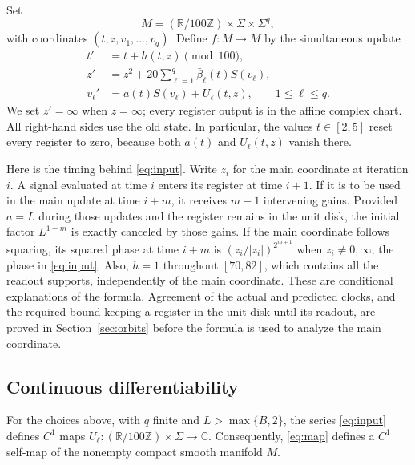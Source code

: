 Set
\[
 M=(\mathbb R/100\mathbb Z)\times\Sigma\times\Sigma^q,
\]
with coordinates $(t,z,v_1,\ldots,v_q)$.  Define $f\colon M\to M$ by
the simultaneous update
\begin{equation}
\label{eq:map}
\begin{aligned}
 t'&=t+h(t,z)\pmod{100},\\
 z'&=z^2+20\sum_{\ell=1}^q\bar\beta_\ell(t)S(v_\ell),\\
 v_\ell'&=a(t)S(v_\ell)+U_\ell(t,z),\qquad 1\le \ell\le q.
\end{aligned}
\end{equation}
We set $z'=\infty$ when $z=\infty$; every register output is in the
affine complex chart.  All right-hand sides use the old state.  In
particular, the values $t\in[2,5]$ reset every register to zero, because
both $a(t)$ and $U_\ell(t,z)$ vanish there.

Here is the timing behind \eqref{eq:input}.  Write $z_i$ for the main
coordinate at iteration $i$.  A signal evaluated at time $i$ enters
its register at time $i+1$.  If it is to be used in the main
update at time $i+m$, it receives $m-1$ intervening gains.  Provided
$a=L$ during those updates and the register remains in the unit disk,
the initial factor $L^{1-m}$ is exactly canceled by those gains.  If the
main coordinate follows squaring, its squared phase at time $i+m$ is
$(z_i/|z_i|)^{2^{m+1}}$ when $z_i\ne0,\infty$, the phase in
\eqref{eq:input}.  Also, $h=1$ throughout $[70,82]$, which contains
all the readout supports, independently of the main coordinate.
These are conditional explanations of the formula.  Agreement of the actual and
predicted clocks, and the required bound keeping a register in the unit
disk until its readout, are proved in Section~\ref{sec:orbits} before
the formula is used to analyze the main coordinate.



\subsection{Continuous differentiability}

\begin{proposition}
\label{prop:regularity}
For the choices above, with $q$ finite and $L>\max\{B,2\}$, the series
\eqref{eq:input} defines $C^1$ maps
$U_\ell\colon(\mathbb R/100\mathbb Z)\times\Sigma\to\mathbb C$.
Consequently, \eqref{eq:map} defines a $C^1$ self-map of the nonempty
compact smooth manifold $M$.
\end{proposition}

